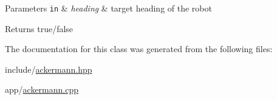 \begin{DoxyParams}[1]{Parameters}
\mbox{\tt in}  & {\em heading} & target heading of the robot \\
\hline
\end{DoxyParams}
\begin{DoxyReturn}{Returns}
true/false 
\end{DoxyReturn}


The documentation for this class was generated from the following files\+:\begin{DoxyCompactItemize}
\item 
include/\hyperlink{ackermann_8hpp}{ackermann.\+hpp}\item 
app/\hyperlink{ackermann_8cpp}{ackermann.\+cpp}\end{DoxyCompactItemize}
